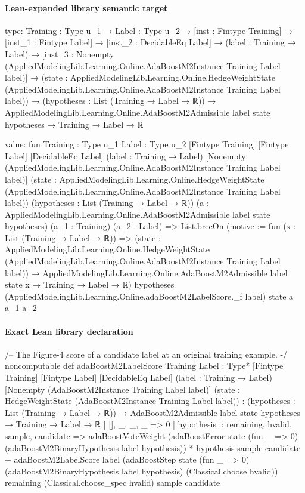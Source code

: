 \documentclass[10pt]{article}
\begin{document}
\paragraph{Lean-expanded library semantic target}
\begin{ReviewVerbatim}
type:
{Training : Type u_1} →
  {Label : Type u_2} →
    [inst : Fintype Training] →
      [inst_1 : Fintype Label] →
        [inst_2 : DecidableEq Label] →
          (label : Training → Label) →
            [inst_3 : Nonempty (AppliedModelingLib.Learning.Online.AdaBoostM2Instance Training Label label)] →
              (state :
                  AppliedModelingLib.Learning.Online.HedgeWeightState
                    (AppliedModelingLib.Learning.Online.AdaBoostM2Instance Training Label label)) →
                (hypotheses : List (Training → Label → ℝ)) →
                  AppliedModelingLib.Learning.Online.AdaBoostM2Admissible label state hypotheses → Training → Label → ℝ

value:
fun {Training : Type u_1} {Label : Type u_2} [Fintype Training] [Fintype Label] [DecidableEq Label]
    (label : Training → Label) [Nonempty (AppliedModelingLib.Learning.Online.AdaBoostM2Instance Training Label label)]
    (state :
      AppliedModelingLib.Learning.Online.HedgeWeightState
        (AppliedModelingLib.Learning.Online.AdaBoostM2Instance Training Label label))
    (hypotheses : List (Training → Label → ℝ))
    (a : AppliedModelingLib.Learning.Online.AdaBoostM2Admissible label state hypotheses) (a_1 : Training)
    (a_2 : Label) =>
  List.brecOn (motive := fun (x : List (Training → Label → ℝ)) =>
    (state :
        AppliedModelingLib.Learning.Online.HedgeWeightState
          (AppliedModelingLib.Learning.Online.AdaBoostM2Instance Training Label label)) →
      AppliedModelingLib.Learning.Online.AdaBoostM2Admissible label state x → Training → Label → ℝ)
    hypotheses (AppliedModelingLib.Learning.Online.adaBoostM2LabelScore._f label) state a a_1 a_2
\end{ReviewVerbatim}

\paragraph{Exact Lean library declaration}
\begin{ReviewVerbatim}
/-- The Figure-4 score of a candidate label at an original training example. -/
noncomputable def adaBoostM2LabelScore
    {Training Label : Type*} [Fintype Training] [Fintype Label] [DecidableEq Label]
    (label : Training → Label)
    [Nonempty (AdaBoostM2Instance Training Label label)]
    (state : HedgeWeightState (AdaBoostM2Instance Training Label label)) :
    (hypotheses : List (Training → Label → ℝ)) →
      AdaBoostM2Admissible label state hypotheses → Training → Label → ℝ
  | [], _, _, _ => 0
  | hypothesis :: remaining, hvalid, sample, candidate =>
      adaBoostVoteWeight
          (adaBoostError state (fun _ => 0) (adaBoostM2BinaryHypothesis label hypothesis)) *
        hypothesis sample candidate +
      adaBoostM2LabelScore label
        (adaBoostStep state (fun _ => 0) (adaBoostM2BinaryHypothesis label hypothesis)
          (Classical.choose hvalid)) remaining (Classical.choose_spec hvalid) sample candidate
\end{ReviewVerbatim}
\end{document}
